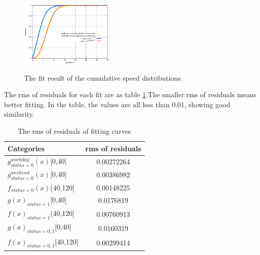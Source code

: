\begin{figure}[htbp]
\centering
\includegraphics[width=0.4\textwidth]{figures_201103/fit/speedfit.eps}\\
\centering
\caption{The fit result of the cumulative speed distributions.}\label{figure_fit_ccdf_speed}
\end{figure}

The rms of residuals for each fit are as table \ref{table_rms}.The smaller rms of residuals means better fitting. In the table, the values are all less than 0.01, showing good similarity.

\begin{table}[!t]
\caption{The rms of residuals of fitting curves}\label{table_rms}
\centering
\begin{tabular}{l|c}
  \hline
  Categories & rms of residuals  \\
  \hline
  $g_{status=0}^{workday}(x)$[0,40] & 0.00272264\\
  $g_{status=0}^{weekend}(x)$[0,40] & 0.00386982  \\
  $f_{status=0}(x)$(40,120] & 0.00148225\\
  $g(x)_{status=1}$[0,40]& 0.0176819 \\
  $f(x)_{status=1}$(40,120] & 0.00760913\\
  $g(x)_{status=0,1}$[0,40]& 0.0160319\\
  $f(x)_{status=0,1}$[40,120]& 0.00299414\\
  \hline
\end{tabular}
\end{table}

